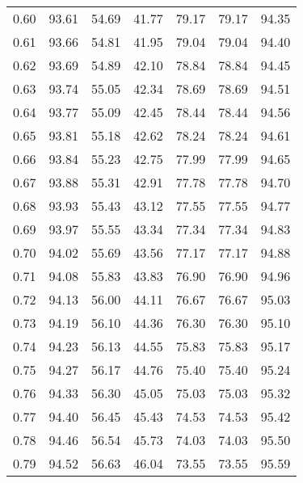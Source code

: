 \begin{tabular}{|c|c|c|c|c|c|c|}
      0.60 &     93.61 &     54.69 &      41.77 &   79.17 &      79.17 &         94.35 \\
      0.61 &     93.66 &     54.81 &      41.95 &   79.04 &      79.04 &         94.40 \\
      0.62 &     93.69 &     54.89 &      42.10 &   78.84 &      78.84 &         94.45 \\
      0.63 &     93.74 &     55.05 &      42.34 &   78.69 &      78.69 &         94.51 \\
      0.64 &     93.77 &     55.09 &      42.45 &   78.44 &      78.44 &         94.56 \\
      0.65 &     93.81 &     55.18 &      42.62 &   78.24 &      78.24 &         94.61 \\
      0.66 &     93.84 &     55.23 &      42.75 &   77.99 &      77.99 &         94.65 \\
      0.67 &     93.88 &     55.31 &      42.91 &   77.78 &      77.78 &         94.70 \\
      0.68 &     93.93 &     55.43 &      43.12 &   77.55 &      77.55 &         94.77 \\
      0.69 &     93.97 &     55.55 &      43.34 &   77.34 &      77.34 &         94.83 \\
      0.70 &     94.02 &     55.69 &      43.56 &   77.17 &      77.17 &         94.88 \\
      0.71 &     94.08 &     55.83 &      43.83 &   76.90 &      76.90 &         94.96 \\
      0.72 &     94.13 &     56.00 &      44.11 &   76.67 &      76.67 &         95.03 \\
      0.73 &     94.19 &     56.10 &      44.36 &   76.30 &      76.30 &         95.10 \\
      0.74 &     94.23 &     56.13 &      44.55 &   75.83 &      75.83 &         95.17 \\
      0.75 &     94.27 &     56.17 &      44.76 &   75.40 &      75.40 &         95.24 \\
      0.76 &     94.33 &     56.30 &      45.05 &   75.03 &      75.03 &         95.32 \\
      0.77 &     94.40 &     56.45 &      45.43 &   74.53 &      74.53 &         95.42 \\
      0.78 &     94.46 &     56.54 &      45.73 &   74.03 &      74.03 &         95.50 \\
      0.79 &     94.52 &     56.63 &      46.04 &   73.55 &      73.55 &         95.59 \\

\end{tabular}
